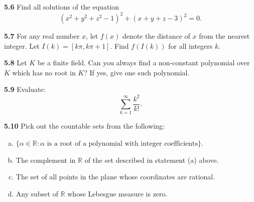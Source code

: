 \documentclass[11pt,a4paper]{article}
\newcommand{\R}{\mathbb{R}}
\newcommand{\qitem}[1]{\par\medskip\noindent\textbf{#1}\hspace{0.5em}}
\begin{document}
\qitem{5.6} Find all solutions of the equation
\[
  (x^2 + y^2 + z^2 - 1)^2 + (x + y + z - 3)^2 = 0.
\]

\qitem{5.7} For any real number $x$, let $f(x)$ denote the distance of $x$ from the nearest integer. Let $I(k) = [k\pi, k\pi + 1]$. Find $f(I(k))$ for all integers $k$.

\qitem{5.8} Let $K$ be a finite field. Can you always find a non-constant polynomial over $K$ which has no root in $K$? If yes, give one such polynomial.

\qitem{5.9} Evaluate:
\[
  \sum_{k=1}^{\infty} \frac{k^2}{k!}.
\]

\qitem{5.10} Pick out the countable sets from the following:
\begin{enumerate}[a.]
  \item $\{\alpha \in \R : \alpha \text{ is a root of a polynomial with integer coefficients}\}$.
  \item The complement in $\R$ of the set described in statement (a) above.
  \item The set of all points in the plane whose coordinates are rational.
  \item Any subset of $\R$ whose Lebesgue measure is zero.
\end{enumerate}
\end{document}
